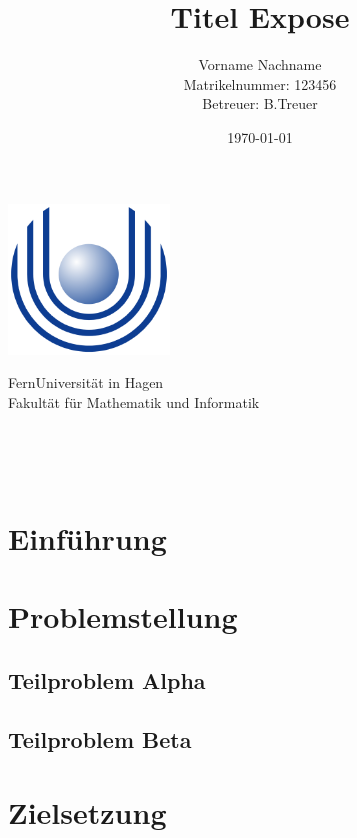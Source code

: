 \documentclass[a4paper,oneside,11pt]{article}
\title{Titel Expose}
\author{
    Vorname Nachname\\
    {\small Matrikelnummer: 123456}\\
    [1cm]{\small Betreuer: B.Treuer}
}
\date{\today}
\begin{document}
\begin{titlingpage} %
\begin{center}
\includegraphics[height=4cm]{images/Uni_hagen_logo}\\ %
\begin{large}
FernUniversit\"at in Hagen \\ %
Fakult\"at f\"ur Mathematik und Informatik\\
\end{large}
\vspace{4cm} %
\begin{large} 
\textbf{\thetitle} \\
\end{large}
\theauthor\\
\vspace{7cm} %
\thedate
\end{center}
\end{titlingpage}

\section{Einf\"uhrung}


\section{Problemstellung}

\subsection{Teilproblem Alpha}

\subsection{Teilproblem Beta}


\section{Zielsetzung}

\end{document}

